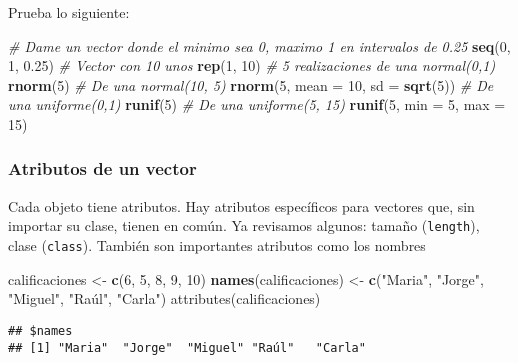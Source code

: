 \documentclass[]{article}
\newenvironment{Shaded}{\begin{snugshade}}{\end{snugshade}}
\newcommand{\KeywordTok}[1]{\textcolor[rgb]{0.13,0.29,0.53}{\textbf{#1}}}
\newcommand{\DataTypeTok}[1]{\textcolor[rgb]{0.13,0.29,0.53}{#1}}
\newcommand{\DecValTok}[1]{\textcolor[rgb]{0.00,0.00,0.81}{#1}}
\newcommand{\FloatTok}[1]{\textcolor[rgb]{0.00,0.00,0.81}{#1}}
\newcommand{\StringTok}[1]{\textcolor[rgb]{0.31,0.60,0.02}{#1}}
\newcommand{\CommentTok}[1]{\textcolor[rgb]{0.56,0.35,0.01}{\textit{#1}}}
\newcommand{\NormalTok}[1]{#1}
\begin{document}
Prueba lo siguiente:

\begin{Shaded}
\begin{Highlighting}[]
\CommentTok{# Dame un vector donde el minimo sea 0, maximo 1 en intervalos de 0.25}
\KeywordTok{seq}\NormalTok{(}\DecValTok{0}\NormalTok{, }\DecValTok{1}\NormalTok{, }\FloatTok{0.25}\NormalTok{)}
\CommentTok{# Vector con 10 unos}
\KeywordTok{rep}\NormalTok{(}\DecValTok{1}\NormalTok{, }\DecValTok{10}\NormalTok{)}
\CommentTok{# 5 realizaciones de una normal(0,1)}
\KeywordTok{rnorm}\NormalTok{(}\DecValTok{5}\NormalTok{)}
\CommentTok{# De una normal(10, 5)}
\KeywordTok{rnorm}\NormalTok{(}\DecValTok{5}\NormalTok{, }\DataTypeTok{mean =} \DecValTok{10}\NormalTok{, }\DataTypeTok{sd =} \KeywordTok{sqrt}\NormalTok{(}\DecValTok{5}\NormalTok{))}
\CommentTok{# De una uniforme(0,1)}
\KeywordTok{runif}\NormalTok{(}\DecValTok{5}\NormalTok{)}
\CommentTok{# De una uniforme(5, 15)}
\KeywordTok{runif}\NormalTok{(}\DecValTok{5}\NormalTok{, }\DataTypeTok{min =} \DecValTok{5}\NormalTok{, }\DataTypeTok{max =} \DecValTok{15}\NormalTok{)}
\end{Highlighting}
\end{Shaded}

\subsubsection{Atributos de un vector}\label{atributos-de-un-vector}

Cada objeto tiene atributos. Hay atributos específicos para vectores
que, sin importar su clase, tienen en común. Ya revisamos algunos:
tamaño (\texttt{length}), clase (\texttt{class}). También son
importantes atributos como los nombres

\begin{Shaded}
\begin{Highlighting}[]
\NormalTok{calificaciones <-}\StringTok{ }\KeywordTok{c}\NormalTok{(}\DecValTok{6}\NormalTok{, }\DecValTok{5}\NormalTok{, }\DecValTok{8}\NormalTok{, }\DecValTok{9}\NormalTok{, }\DecValTok{10}\NormalTok{)}
\KeywordTok{names}\NormalTok{(calificaciones) <-}\StringTok{ }\KeywordTok{c}\NormalTok{(}\StringTok{"Maria"}\NormalTok{, }\StringTok{"Jorge"}\NormalTok{, }\StringTok{"Miguel"}\NormalTok{, }\StringTok{"Raúl", "}\NormalTok{Carla}\StringTok{")}
\StringTok{attributes(calificaciones)}
\end{Highlighting}
\end{Shaded}

\begin{verbatim}
## $names
## [1] "Maria"  "Jorge"  "Miguel" "Raúl"   "Carla"
\end{verbatim}
\end{document}
